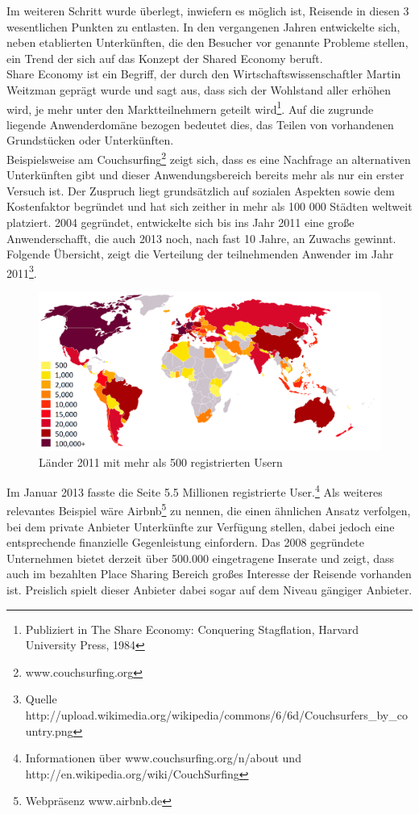 Im weiteren Schritt wurde überlegt, inwiefern es möglich ist, Reisende in diesen 3 wesentlichen Punkten zu entlasten.
In den vergangenen Jahren entwickelte sich, neben etablierten Unterkünften, die den Besucher vor genannte Probleme stellen, ein Trend der sich auf das Konzept der Shared Economy beruft.\\
Share Economy ist ein Begriff, der durch den Wirtschaftswissenschaftler Martin Weitzman geprägt wurde und sagt aus, dass sich der Wohlstand aller erhöhen wird, je mehr unter den Marktteilnehmern geteilt wird\footnote{Publiziert in The Share Economy: Conquering Stagflation, Harvard University Press, 1984}. Auf die zugrunde liegende Anwenderdomäne bezogen bedeutet dies, das Teilen von vorhandenen Grundstücken oder Unterkünften.\\  
Beispielsweise am Couchsurfing\footnote{www.couchsurfing.org} zeigt sich, dass es eine Nachfrage an alternativen Unterkünften gibt und dieser Anwendungsbereich bereits mehr als nur ein erster Versuch ist. Der Zuspruch liegt grundsätzlich auf sozialen Aspekten sowie dem Kostenfaktor begründet und hat sich zeither in mehr als 100 000 Städten weltweit platziert. 2004 gegründet, entwickelte sich bis ins Jahr 2011 eine große Anwenderschafft, die auch 2013 noch, nach fast 10 Jahre, an Zuwachs gewinnt. 
Folgende Übersicht, zeigt die Verteilung der teilnehmenden Anwender im Jahr 2011\footnote{Quelle http://upload.wikimedia.org/wikipedia/commons/6/6d/Couchsurfers\_by\_country.png}. 

\begin{figure}[H]
\centering
\includegraphics[width=1.0\textwidth]{./images/couchsurfers.png}
\caption{Länder 2011 mit mehr als 500 registrierten Usern} 
\label{Couchsurfer}
\end{figure}


Im Januar 2013 fasste die Seite 5.5 Millionen registrierte User.\footnote{Informationen über www.couchsurfing.org/n/about und http://en.wikipedia.org/wiki/CouchSurfing} Als weiteres relevantes Beispiel wäre Airbnb\footnote{Webpräsenz www.airbnb.de} zu nennen, die einen ähnlichen Ansatz verfolgen, bei dem private Anbieter Unterkünfte zur Verfügung stellen, dabei jedoch eine entsprechende finanzielle Gegenleistung einfordern.
Das 2008 gegründete Unternehmen bietet derzeit über 500.000 eingetragene Inserate und zeigt, dass auch im bezahlten Place Sharing Bereich großes Interesse der Reisende vorhanden ist. Preislich spielt dieser Anbieter dabei sogar auf dem Niveau gängiger Anbieter.\\


